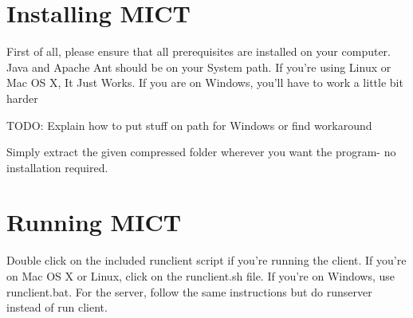 \documentclass[11pt,oneside,a4paper]{article}
\begin{document}
\section{Installing MICT}
First of all, please ensure that all prerequisites are installed on your
computer. Java and Apache Ant should be on your System path. If you're using
Linux or Mac OS X, It Just Works\texttrademark. If you are on Windows, you'll
have to work a little bit harder

TODO: Explain how to put stuff on path for Windows or find workaround

Simply extract the given compressed folder wherever you want the program- no
installation required.

\section{Running MICT}
Double click on the included runclient script if you're running the client. If
you're on Mac OS X or Linux, click on the runclient.sh file. If you're on
Windows, use runclient.bat. For the server, follow the same instructions but
do runserver instead of run client.
\end{document}
